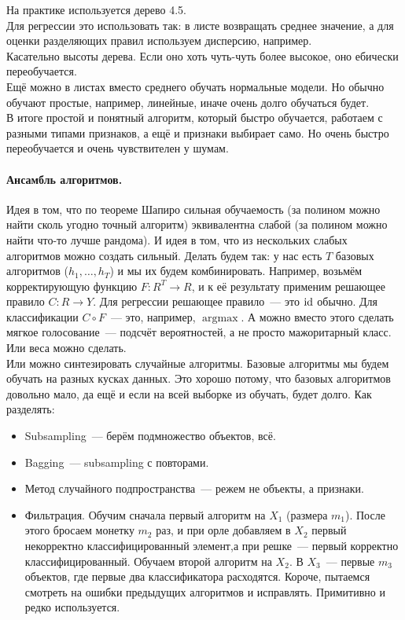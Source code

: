 \documentclass{article}
\begin{document}
    На практике используется дерево 4.5.\\
    Для регрессии это использовать так: в листе возвращать среднее значение, а для оценки разделяющих правил используем дисперсию, например.\\
    Касательно высоты дерева. Если оно хоть чуть-чуть более высокое, оно ебически переобучается.\\
    Ещё можно в листах вместо среднего обучать нормальные модели. Но обычно обучают простые, например, линейные, иначе очень долго обучаться будет.\\
    В итоге простой и понятный алгоритм, который быстро обучается, работаем с разными типами признаков, а ещё и признаки выбирает само. Но очень быстро переобучается и очень чувствителен у шумам.
    \paragraph{Ансамбль алгоритмов.}
    Идея в том, что по теореме Шапиро сильная обучаемость (за полином можно найти сколь угодно точный алгоритм) эквивалентна слабой (за полином можно найти что-то лучше рандома). И идея в том, что из нескольких слабых алгоритмов можно создать сильный. Делать будем так: у нас есть $T$ базовых алгоритмов ($h_1,\ldots,h_T$) и мы их будем комбинировать. Например, возьмём корректирующую функцию $F\colon R^T\to R$, и к её результату применим решающее правило $C\colon R\to Y$. Для регрессии решающее правило~--- это ${\mathrm{id}}$ обычно. Для классификации $C\circ F$~--- это, например, $\operatorname{argmax}$. А можно вместо этого сделать мягкое голосование~--- подсчёт вероятностей, а не просто мажоритарный класс. Или веса можно сделать.\\
    Или можно синтезировать случайные алгоритмы. Базовые алгоритмы мы будем обучать на разных кусках данных. Это хорошо потому, что базовых алгоритмов довольно мало, да ещё и если на всей выборке из обучать, будет долго. Как разделять:
    \begin{itemize}
        \item Subsampling~--- берём подмножество объектов, всё. 
        \item Bagging~--- subsampling с повторами.
        \item Метод случайного подпространства~--- режем не объекты, а признаки.
        \item Фильтрация. Обучим сначала первый алгоритм на $X_1$ (размера $m_1$). После этого бросаем монетку $m_2$ раз, и при орле добавляем в $X_2$ первый некорректно классифицированный элемент,а при решке~--- первый корректно классифицированный. Обучаем второй алгоритм на $X_2$. В $X_3$~--- первые $m_3$ объектов, где первые два классификатора расходятся. Короче, пытаемся смотреть на ошибки предыдущих алгоритмов и исправлять. Примитивно и редко используется.
    \end{itemize}
\end{document}
